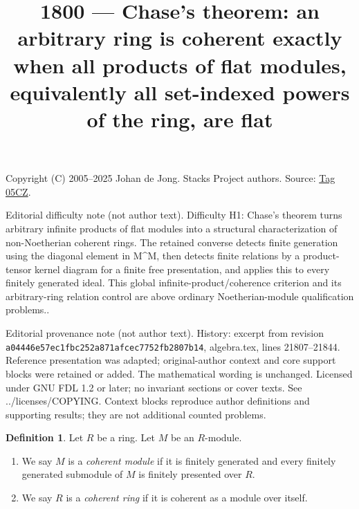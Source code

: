 \documentclass{amsart}
\theoremstyle{plain}
\theoremstyle{definition}
\newtheorem{definition}[subsection]{Definition}
\theoremstyle{remark}
\numberwithin{equation}{subsection}
\begin{document}
\title[Stacks Project, Tag 05CZ]{1800 --- Chase\textquoteright{}s theorem: an arbitrary ring is coherent exactly when all products of flat modules, equivalently all set-indexed powers of the ring, are flat}
\maketitle
\noindent Copyright (C) 2005--2025 Johan de Jong. Stacks Project authors. Source: \href{https://stacks.math.columbia.edu/tag/05CZ}{Tag 05CZ}.

\noindent Editorial difficulty note (not author text). Difficulty H1: Chase\textquoteright{}s theorem turns arbitrary infinite products of flat modules into a structural characterization of non-Noetherian coherent rings. The retained converse detects finite generation using the diagonal element in M\textasciicircum{}M, then detects finite relations by a product-tensor kernel diagram for a finite free presentation, and applies this to every finitely generated ideal. This global infinite-product/coherence criterion and its arbitrary-ring relation control are above ordinary Noetherian-module qualification problems..

\noindent Editorial provenance note (not author text). History: excerpt from revision \texttt{a0444\allowbreak 6e57e\allowbreak c1fbc\allowbreak 252a8\allowbreak 71afc\allowbreak ec775\allowbreak 2fb28\allowbreak 07b14}, algebra.tex, lines 21807--21844. Reference presentation was adapted; original-author context and core support blocks were retained or added. The mathematical wording is unchanged. Licensed under GNU FDL 1.2 or later; no invariant sections or cover texts. See ../licenses/COPYING. Context blocks reproduce author definitions and supporting results; they are not additional counted problems.

\begin{definition}
\label{definition-coherent}
Let $R$ be a ring. Let $M$ be an $R$-module.
\begin{enumerate}
\item We say $M$ is a {\it coherent module} if it is finitely generated
and every finitely generated submodule of $M$ is finitely presented over
$R$.
\item We say $R$ is a {\it coherent ring} if it is coherent as a module
over itself.
\end{enumerate}
\end{definition}
\end{document}
